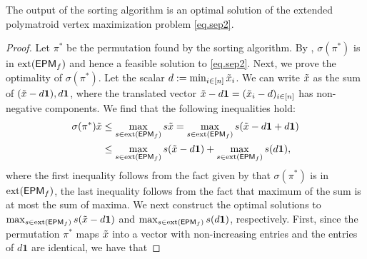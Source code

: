 \begin{proposition}
\label{prop.out}
The output of the sorting algorithm is an optimal solution of the extended polymatroid vertex maximization problem \eqref{eq.sep2}.
\end{proposition}
\begin{proof}
Let $\pi^\ast$ be the permutation found by the sorting algorithm. By , $\sigma(\pi^\ast)$ is in $\operatorname{ext}(\mathsf{EPM}_{f})$ and hence  a feasible solution to \eqref{eq.sep2}.  Next, we prove the optimality of $\sigma(\pi^\ast)$. Let the scalar $d := \min_{i \in [n]} \tilde{x}_i$. We can write $\tilde{x}$ as the sum of $(\tilde{x} - d\mathbf{1}), d\mathbf{1}$, where the translated vector $\tilde{x} - d\mathbf{1}  = (\tilde{x}_i-d)_{i \in [n]}$ has non-negative components. We find that the following inequalities hold:
\begin{equation}
\label{eq.many}
\begin{split}
   \sigma(\pi^\ast) \tilde{x} & \le \max_{s \in \operatorname{ext}(\mathsf{EPM}_{f})} s \tilde{x} = \max_{s \in \operatorname{ext}(\mathsf{EPM}_{f})} s (\tilde{x}-d \mathbf{1} +d \mathbf{1}) 
   \\ &\le  \max_{s \in \operatorname{ext}(\mathsf{EPM}_{f})} s  (\tilde{x} - d \mathbf{1}) +  \max_{s \in \operatorname{ext}(\mathsf{EPM}_{f})} s(d \mathbf{1}),
\end{split}
\end{equation}
where the first inequality follows from the fact given by  that $\sigma(\pi^\ast) $ is in $  \operatorname{ext}(\mathsf{EPM}_{f})$, the last inequality follows from the fact that maximum of the sum is at most the sum of maxima. We next construct the optimal solutions to $\max_{s \in \operatorname{ext}(\mathsf{EPM}_{f})} s  (\tilde{x} - d \mathbf{1})$ and $ \max_{s \in \operatorname{ext}(\mathsf{EPM}_{f})} s(d \mathbf{1})$, respectively. First, since the permutation $\pi^\ast$ maps $\tilde{x}$ into a vector with non-increasing entries and the entries of $d\mathbf{1}$ are identical, we have that

\end{proof}
